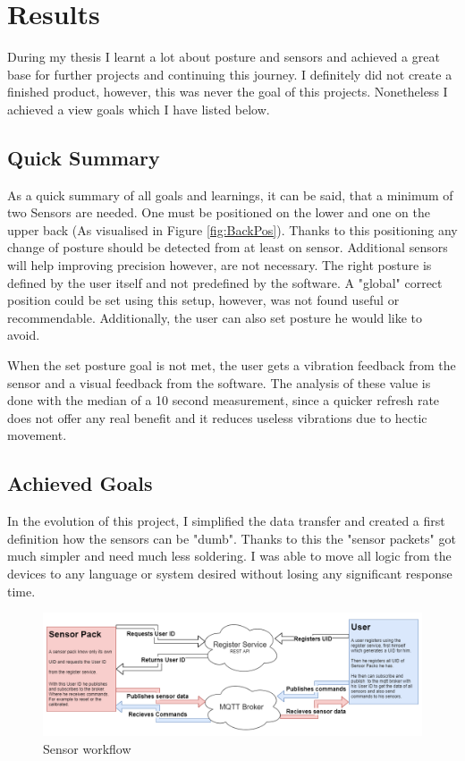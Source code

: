 \chapter*{Results}
\label{chap:Results}
\setcounter{section}{0}

During my thesis I learnt a lot about posture and sensors and achieved a great base for further projects and continuing this journey. I definitely did not create a finished product, however, this was never the goal of this projects. Nonetheless I achieved a view goals which I have listed below.

\section{Quick Summary}

As a quick summary of all goals and learnings, it can be said, that a minimum of two Sensors are needed. One must be positioned on the lower and one on the upper back (As visualised in Figure \ref{fig:BackPos}). Thanks to this positioning any change of posture should be detected from at least on sensor. Additional sensors will help improving precision however, are not necessary. The right posture is defined by the user itself and not predefined by the software. A "global" correct position could be set using this setup, however, was not found useful or recommendable. \cite{SitUpSt77:online} Additionally, the user can also set posture he would like to avoid.

When the set posture goal is not met, the user gets a vibration feedback from the sensor and a visual feedback from the software. The analysis of these value is done with the median of a 10 second measurement, since a quicker refresh rate does not offer any real benefit and it reduces useless vibrations due to hectic movement.

\section{Achieved Goals}

In the evolution of this project, I simplified the data transfer and created a first definition how the sensors can be "dumb". Thanks to this the "sensor packets" got much simpler and need much less soldering. I was able to move all logic from the devices to any language or system desired without losing any significant response time. 

\begin{figure}[h]
  \begin{center}
\includegraphics[width=\textwidth]{images/DumbSensor.png}
  \end{center}
  \caption{Sensor workflow}
  \label{fig:SensorWorkflow}
\end{figure}

